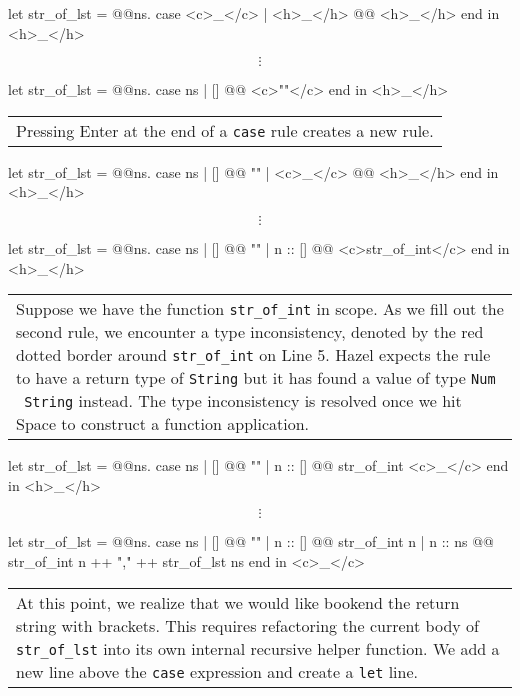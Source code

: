 \documentclass[runningheads]{llncs}
\newcommand{\Hazel}{\textsf{Hazel}\xspace}
\begin{document}
\begin{hazel}
let str_of_lst = 
	@\lam @ns.{
		case <c>_</c>
		| <h>_</h> @\casearrow @ <h>_</h>
		end
	}
in
<h>_</h>
\end{hazel}
	\[\vdots\]
\begin{hazel}
let str_of_lst = 
	@\lam @ns.{
		case ns
		| [] @\casearrow @ <c>""</c>
		end
	}
in
<h>_</h>
\end{hazel}
	\begin{tabular}{|p{\linewidth}}
	Pressing Enter at the end of a \texttt{case} rule creates a new rule.
	\end{tabular}
\begin{hazel}
let str_of_lst = 
	@\lam @ns.{
		case ns
		| [] @\casearrow @ ""
		| <c>_</c>  @\casearrow @ <h>_</h>
		end
	}
in
<h>_</h>
\end{hazel}
	\[\vdots\]
\begin{hazel}
let str_of_lst = 
	@\lam @ns.{
		case ns
		| []      @\casearrow @ ""
		| n :: [] @\casearrow @ <c>str_of_int</c>
		end
	}
in
<h>_</h>
\end{hazel}
	\begin{tabular}{|p{\linewidth}}
	Suppose we have the function \texttt{str\_of\_int} in scope.
	As we fill out the second rule, we encounter a type inconsistency,
	denoted by the red dotted border around \texttt{str\_of\_int} on
	Line 5. \Hazel expects the rule to have a return type of \texttt{String}
	but it has found a value of type \texttt{Num \fnarrow~String} instead.
	The type inconsistency is resolved once we hit Space to construct
	a function application.
	\end{tabular}
\begin{hazel}
let str_of_lst = 
	@\lam @ns.{
		case ns
		| []      @\casearrow @ ""
		| n :: [] @\casearrow @ str_of_int <c>_</c>
		end
	}
in
<h>_</h>
\end{hazel}
	\[\vdots\]
\begin{hazel}
let str_of_lst = 
	@\lam @ns.{
		case ns
		| []      @\casearrow @ ""
		| n :: [] @\casearrow @ str_of_int n		
		| n :: ns @\casearrow @ str_of_int n ++ "," ++ str_of_lst ns
		end
	}
in
<c>_</c>
\end{hazel}
	\begin{tabular}{|p{\linewidth}}
	At this point, we realize that we would like bookend the return string
	with brackets. This requires refactoring the current body of
	\texttt{str\_of\_lst} into its own internal recursive helper function.
	We add a new line above the \texttt{case} expression and create a
	\texttt{let} line.
	\end{tabular}
\end{document}
